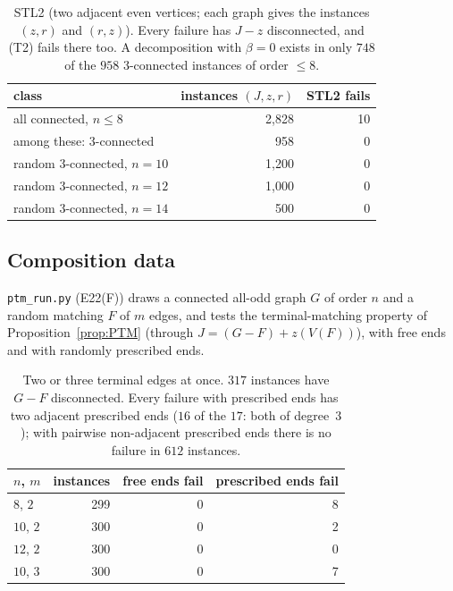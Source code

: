 \documentclass[11pt]{amsart}
\theoremstyle{definition}
\begin{document}
\begin{table}[!ht]
\centering\footnotesize
\begin{tabular}{@{}lrr@{}}
\toprule
class & instances $(J,z,r)$ & STL2 fails\\
\midrule
all connected, $n\le8$ & 2{,}828 & 10\\
\quad among these: $3$-connected & 958 & 0\\
random $3$-connected, $n=10$ & 1{,}200 & 0\\
random $3$-connected, $n=12$ & 1{,}000 & 0\\
random $3$-connected, $n=14$ & 500 & 0\\
\bottomrule
\end{tabular}
\caption{STL2 (two adjacent even vertices; each graph gives the instances $(z,r)$ and $(r,z)$).
Every failure has $J-z$ disconnected, and (T2) fails there too. A decomposition with $\beta=0$
exists in only $748$ of the $958$ $3$-connected instances of order $\le8$.}
\label{tab:stl2}
\end{table}

\subsection{Composition data}
\texttt{ptm\_run.py} (E22(F)) draws a connected all-odd graph $G$ of order $n$ and a random matching
$F$ of $m$ edges, and tests the terminal-matching property of Proposition~\ref{prop:PTM} (through
$J=(G-F)+z(V(F))$), with free ends and with randomly prescribed ends.

\begin{table}[!ht]
\centering\footnotesize
\begin{tabular}{@{}lrrr@{}}
\toprule
$n$, $m$ & instances & free ends fail & prescribed ends fail\\
\midrule
$8$, $2$ & 299 & 0 & 8\\
$10$, $2$ & 300 & 0 & 2\\
$12$, $2$ & 300 & 0 & 0\\
$10$, $3$ & 300 & 0 & 7\\
\bottomrule
\end{tabular}
\caption{Two or three terminal edges at once. $317$ instances have $G-F$ disconnected. Every failure
with prescribed ends has two adjacent prescribed ends ($16$ of the $17$: both of degree~$3$); with
pairwise non-adjacent prescribed ends there is no failure in $612$ instances.}
\label{tab:ptm}
\end{table}
\end{document}
